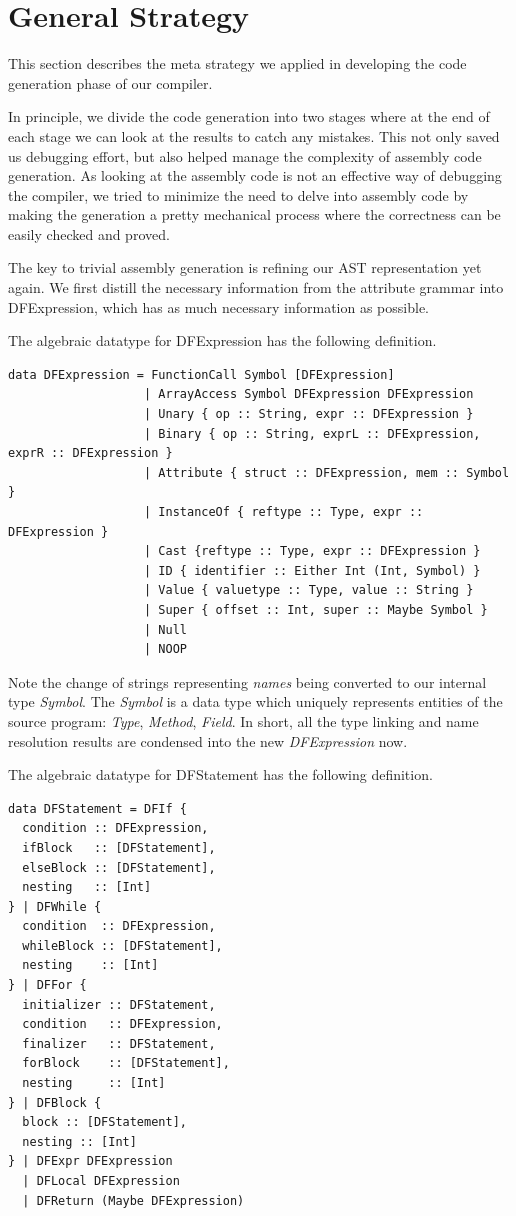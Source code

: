 \documentclass[12pt,letterpaper]{article}
\begin{document}
\section{General Strategy}
This section describes the meta strategy we applied in developing the code generation phase of our compiler.

In principle, we divide the code generation into two stages where at the end of each stage we can look at the results to catch any mistakes.
This not only saved us debugging effort, but also helped manage the complexity of assembly code generation.
As looking at the assembly code is not an effective way of debugging the compiler, we tried to minimize the need to delve into assembly code by making the generation a pretty mechanical process where the correctness can be easily checked and proved.

The key to trivial assembly generation is refining our AST representation yet again. We first distill the necessary information from the attribute grammar into DFExpression, which has as much necessary information as possible.

The algebraic datatype for DFExpression has the following definition.
\begin{lstlisting}
data DFExpression = FunctionCall Symbol [DFExpression]
                   | ArrayAccess Symbol DFExpression DFExpression
                   | Unary { op :: String, expr :: DFExpression }
                   | Binary { op :: String, exprL :: DFExpression, exprR :: DFExpression }
                   | Attribute { struct :: DFExpression, mem :: Symbol }
                   | InstanceOf { reftype :: Type, expr :: DFExpression }
                   | Cast {reftype :: Type, expr :: DFExpression }
                   | ID { identifier :: Either Int (Int, Symbol) }
                   | Value { valuetype :: Type, value :: String }
                   | Super { offset :: Int, super :: Maybe Symbol }
                   | Null
                   | NOOP
\end{lstlisting}

Note the change of strings representing \emph{names} being converted to our internal type \emph{Symbol}. The \emph{Symbol} is a data type which uniquely represents entities of the source program: \emph{Type}, \emph{Method}, \emph{Field}. In short, all the type linking and name resolution results are condensed into the new \emph{DFExpression} now.

The algebraic datatype for DFStatement has the following definition.
\begin{lstlisting}
data DFStatement = DFIf {
  condition :: DFExpression,
  ifBlock   :: [DFStatement],
  elseBlock :: [DFStatement],
  nesting   :: [Int]
} | DFWhile {
  condition  :: DFExpression,
  whileBlock :: [DFStatement],
  nesting    :: [Int]
} | DFFor {
  initializer :: DFStatement,
  condition   :: DFExpression,
  finalizer   :: DFStatement,
  forBlock    :: [DFStatement],
  nesting     :: [Int]
} | DFBlock {
  block :: [DFStatement],
  nesting :: [Int]
} | DFExpr DFExpression
  | DFLocal DFExpression
  | DFReturn (Maybe DFExpression)
\end{lstlisting}
\end{document}
